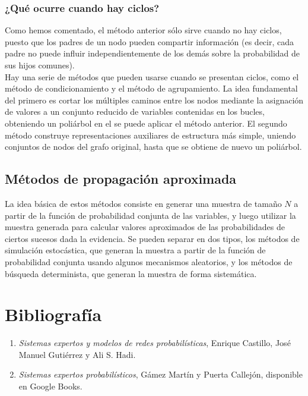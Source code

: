 \documentclass{article}
\theoremstyle{definition_wo_parentheses}
\begin{document}
\subsubsection{¿Qué ocurre cuando hay ciclos?}
Como hemos comentado, el método anterior sólo sirve cuando no hay ciclos, puesto que los padres de un nodo pueden compartir información (es decir, cada padre no puede influir independientemente de los demás sobre la probabilidad de sus hijos comunes).\\
Hay una serie de métodos que pueden usarse cuando se presentan ciclos, como el método de condicionamiento y el método de agrupamiento. La idea fundamental del primero es cortar los múltiples caminos entre los nodos mediante la asignación de valores a un conjunto reducido de variables contenidas en los bucles, obteniendo un poliárbol en el se puede aplicar el método anterior. El segundo método construye representaciones auxiliares de estructura más simple, uniendo conjuntos de nodos del grafo original, hasta que se obtiene de nuevo un poliárbol.

\subsection{Métodos de propagación aproximada}

La idea básica de estos métodos consiste en generar una muestra de tamaño $N$ a partir de la función de probabilidad conjunta de las variables, y luego utilizar la muestra generada para calcular valores aproximados de las probabilidades de ciertos sucesos dada la evidencia. Se pueden separar en dos tipos, los métodos de simulación estocástica, que generan la muestra a partir de la función de probabilidad conjunta usando algunos mecanismos aleatorios, y los métodos de búsqueda determinista, que generan la muestra de forma sistemática.

\section{Bibliografía}

\begin{enumerate}
\item \textit{Sistemas expertos y modelos de redes probabilísticas}, Enrique Castillo, José Manuel Gutiérrez y Ali S. Hadi.
\item \textit{Sistemas expertos probabilísticos}, Gámez Martín y Puerta Callejón, disponible en Google Books.
\end{enumerate}
\end{document}
